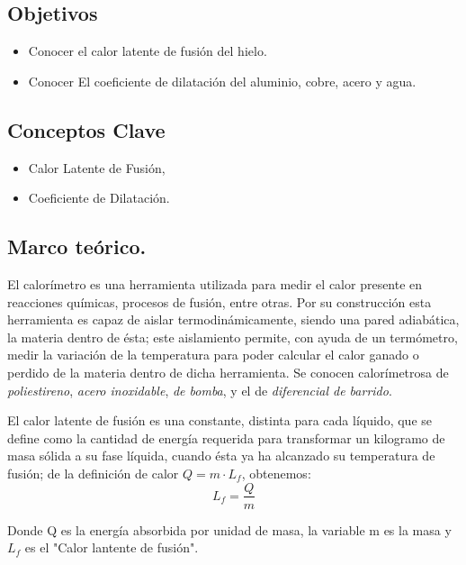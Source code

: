    \subsection{Objetivos}
        \begin{itemize}
            \item Conocer el calor latente de fusión del hielo.
            \item Conocer El coeficiente de dilatación del aluminio, cobre, acero y agua.
        \end{itemize}

    \subsection{Conceptos Clave}
        \begin{itemize}
            \item Calor Latente de Fusión,
            \item Coeficiente de Dilatación.
        \end{itemize}


    \subsection{Marco teórico.}
        
        El calorímetro es una herramienta utilizada para medir el calor presente en reacciones químicas, procesos de fusión, entre otras. Por su construcción esta herramienta es capaz de aislar termodinámicamente, siendo una pared adiabática, la materia dentro de ésta; este aislamiento permite, con ayuda de un termómetro, medir la variación de la temperatura para poder calcular el calor ganado o perdido de la materia dentro de dicha herramienta. Se conocen calorímetrosa de \textit{poliestireno}, \textit{acero inoxidable}, \textit{de bomba}, y el de \textit{diferencial de barrido}. \cite{Calorímetro}
        
        El calor latente de fusión es una constante, distinta para cada líquido, que se define como la cantidad de energía requerida para transformar un kilogramo de masa sólida a su fase líquida, cuando ésta ya ha alcanzado su temperatura de fusión; de la definición de calor $Q = m \cdot L_{f}$, obtenemos:
        \begin{equation}
            L_{f} = \frac{Q}{m}
        \end{equation}
        
        Donde Q es la energía absorbida por unidad de masa, la variable m es la masa y $L_{f}$ es el "Calor lantente de fusión". \cite{CalorLatente}

